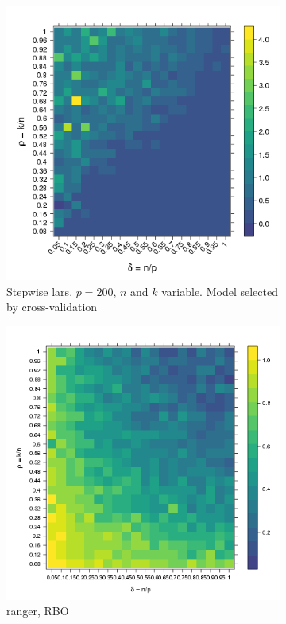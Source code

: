 \documentclass[10pt,letterpaper]{article}
\begin{document}
\begin{figure}[tbhp] 
  \begin{adjustwidth}{-1.00in}{0in}
    \begin{subfigure}[t]{0.5\linewidth}
      \centering
      \includegraphics[totalheight=6cm]{./figs/stepwise_lars_cv.png}
      \caption{Stepwise lars. $p=200$, $n$ and $k$ variable. Model selected by cross-validation}
      \label{figure:stepwise_lars_cv.png}
      \vspace{4ex}
    \end{subfigure} 
    \begin{subfigure}[t]{0.5\linewidth}
      \centering
      \includegraphics[totalheight=6cm]{./figs/ranger.png}
      \caption{ranger, RBO}
      \label{figure:ranger.png}
    \end{subfigure} 
    \caption{}
  \end{adjustwidth}
\end{figure}
\end{document}
